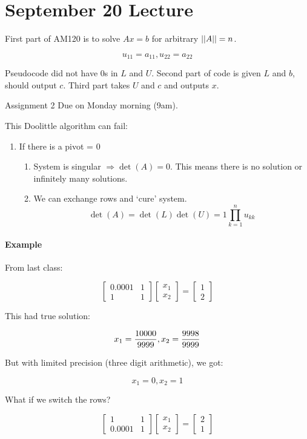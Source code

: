 \section{September 20 Lecture}
First part of AM120 is to solve $Ax=b$ for arbitrary $\left|\left|A\right|\right| = n$.

\[
	u_{11} = a_{11}, u_{22} = a_{22} 
\]

Pseudocode did not have 0s in $L$ and $U$. Second part of code is given $L$ and $b$, should output $c$. Third part takes $U$ and $c$ and outputs $x$.

Assignment 2 Due on Monday morning (9am).

This Doolittle algorithm can fail:
\begin{enumerate}
	\item If there is a pivot = 0
	\begin{enumerate}
		\item System is singular $\Rightarrow \det(A) = 0$. This means there is no solution or infinitely many solutions.
		\item We can exchange rows and `cure' system.
		\[
			\det(A) = \det(L) \det(U) = 1 \prod_{k=1}^n u_{kk}
		\]
	\end{enumerate}
\end{enumerate}


\paragraph{Example} From last class:

\[
	\begin{bmatrix}
		0.0001 & 1 \\ 1 & 1
	\end{bmatrix}
	\begin{bmatrix}
		x_1 \\ x_2
	\end{bmatrix} = 
	\begin{bmatrix}
		1 \\ 2
	\end{bmatrix}
\]

This had true solution:

\[
		x_1 = {10000 \over 9999}, x_2 = {9998 \over 9999}
\]

But with limited precision (three digit arithmetic), we got:

\[
		x_1 = 0, x_2 = 1
\]

What if we switch the rows?

\[
	\begin{bmatrix}
		1 & 1 \\ 0.0001 & 1
	\end{bmatrix}
	\begin{bmatrix}
		x_1 \\ x_2
	\end{bmatrix} = 
	\begin{bmatrix}
		2 \\ 1
	\end{bmatrix}
\]

